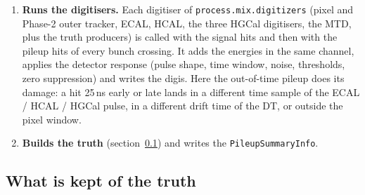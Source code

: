 \documentclass[11pt,a4paper]{article}
\newcommand{\code}[1]{\texttt{#1}}
\begin{document}
\begin{enumerate}
  \code{mixCH} (the \code{PCaloHit} collections of ECAL, HCAL, ZDC, Castor and, through the
  \code{phase2\_hgcal} era modifier, the three HGCal collections), \code{mixTracks}, \code{mixVertices} and
  \code{mixHepMC}. The \code{CrossingFrame}s are \emph{transient} products: they are built in memory,
  consumed by the digitisers in the same module call, and never written to the output file (``transient''
  means exactly that: the product lives in the memory of the running job and nowhere else, and
  \code{edmDumpEventContent} of the output file will not show it; this is why the analyzer of
  section~\ref{sec:analyzer} has to run inside the mixing job). Moreover by
  default they are only built where a consumer in the event needs them: the \code{crossingFrames} list of
  \code{mixSH} contains only the muon and MTD collections, \code{mixCH} none (the calorimeter digitisers take the
  hits directly from the \code{MixCollection}), and \code{makeCrossingFrame = False} for the tracks and
  vertices. The analyzer therefore has to switch them on (section~\ref{sec:analyzer}).
\item \textbf{Runs the digitisers.} Each digitiser of \code{process.mix.digitizers} (pixel and Phase-2 outer
  tracker, ECAL, HCAL, the three HGCal digitisers, the MTD, plus the truth producers) is called with the signal hits and then with the pileup hits of
  every bunch crossing. It adds the energies in the same channel, applies the detector response (pulse
  shape, time window, noise, thresholds, zero suppression) and writes the digis. Here the out-of-time pileup
  does its damage: a hit 25\,ns early or late lands in a different time sample of the ECAL / HCAL / HGCal
  pulse, in a different drift time of the DT, or outside the pixel window.
\item \textbf{Builds the truth} (section~\ref{sec:truth}) and writes the \code{PileupSummaryInfo}.
\end{enumerate}

\subsection{What is kept of the truth}
\label{sec:truth}
\end{document}
